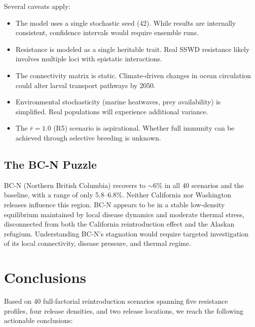 \documentclass[11pt,a4paper]{article}
\newcommand{\rbar}{\ensuremath{\bar{r}}}
\begin{document}
Several caveats apply:
\begin{itemize}[nosep]
  \item The model uses a single stochastic seed (42). While results are internally consistent, confidence intervals would require ensemble runs.
  \item Resistance is modeled as a single heritable trait. Real SSWD resistance likely involves multiple loci with epistatic interactions.
  \item The connectivity matrix is static. Climate-driven changes in ocean circulation could alter larval transport pathways by 2050.
  \item Environmental stochasticity (marine heatwaves, prey availability) is simplified. Real populations will experience additional variance.
  \item The $\rbar=1.0$ (R5) scenario is aspirational. Whether full immunity can be achieved through selective breeding is unknown.
\end{itemize}

\subsection{The BC-N Puzzle}

BC-N (Northern British Columbia) recovers to ${\sim}$6\% in all 40 scenarios and the baseline, with a range of only 5.8--6.8\%. Neither California nor Washington releases influence this region. BC-N appears to be in a stable low-density equilibrium maintained by local disease dynamics and moderate thermal stress, disconnected from both the California reintroduction effect and the Alaskan refugium. Understanding BC-N's stagnation would require targeted investigation of its local connectivity, disease pressure, and thermal regime.


\section{Conclusions}

Based on 40 full-factorial reintroduction scenarios spanning five resistance profiles, four release densities, and two release locations, we reach the following actionable conclusions:
\end{document}
